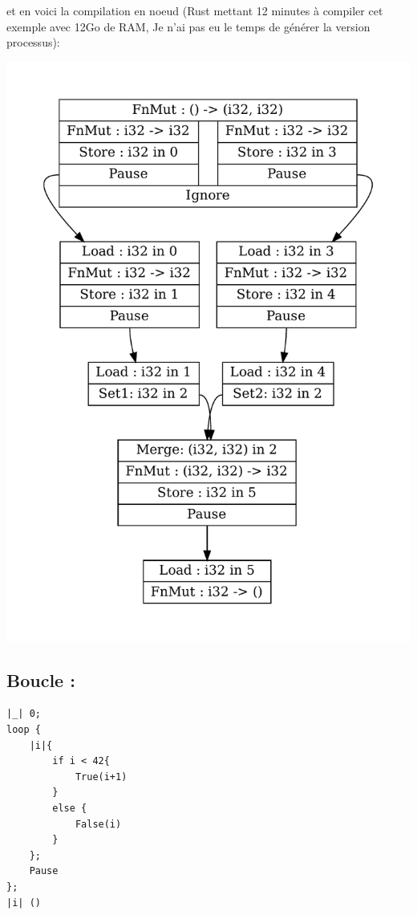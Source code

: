 \documentclass[a4paper]{article}
\renewcommand{\(}{\left(}
\renewcommand{\)}{\right)}
\begin{document}
et en voici la compilation en noeud (Rust mettant 12 minutes à compiler cet
exemple avec 12Go de RAM, Je n'ai pas eu le temps de générer la version processus):
\begin{center}
\includegraphics[scale=0.8]{test.pdf}
\end{center}


\subsection{Boucle :}

\begin{verbatim}
|_| 0;
loop {
    |i|{
        if i < 42{
            True(i+1)
        }
        else {
            False(i)
        }
    };
    Pause
};
|i| ()
\end{verbatim}
\end{document}
